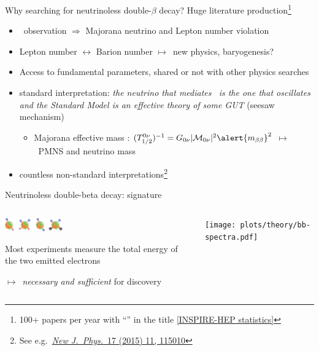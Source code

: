 \documentclass[10pt,aspectratio=169]{beamer}
\newcommand{\arrow}{$\longmapsto$}
\begin{document}
\begin{frame}{Why searching for neutrinoless double-$\beta$ decay?}
  Huge literature production\footnote{%
    100+ papers per year with ``\onbb'' in the title
    \href{https://inspirehep.net/literature?sort=mostrecent&size=25&page=1&q=find\%20t\%20\%CE\%B2\%CE\%B2\%20or\%20double-beta\%20or\%20double\%20beta\%20or\%20double\%20\%CE\%B2\%20or\%20double-\%CE\%B2\%20or\%200\%CE\%BD\%CE\%B2\%CE\%B2&ui-citation-summary=true}{[INSPIRE-HEP statistics]}
  }
  \begin{itemize}
    \item \onbb\ observation $\Rightarrow$ \alert{Majorana neutrino} and \alert{Lepton number violation}
    \item Lepton number $\longleftrightarrow$ Barion number \arrow\
      \alert{new physics}, \alert{baryogenesis?}
    \item Access to fundamental parameters, shared or not with other
      physics searches
    \item \alert{standard interpretation}: \emph{the neutrino that mediates
      \onbb\ is the one that oscillates and the Standard Model is an effective
      theory of some GUT} (seesaw mechanism)
    \begin{itemize}
      \item Majorana effective mass \mbb:
        $(T^{0\nu}_{1/2})^{-1}=G_{0\nu} |\mathcal{M}_{0\nu}|^2 \alert{m_{\beta\beta}}^2$
        \arrow\ PMNS and neutrino mass
    \end{itemize}
  \item countless non-standard interpretations\footnote{See e.g.~\href{https://doi.org/10.1088/1367-2630/17/11/115010}{\emph{New J.~Phys.}~17 (2015) 11, 115010}}
  \end{itemize}
\end{frame}
\begin{frame}{Neutrinoless double-beta decay: signature}
  \begin{columns}
    \begin{column}{0.5\textwidth}
      \begin{center}
        \includegraphics[width=2.5cm,angle=-90,clip,trim=200 0 500 0]{plots/theory/bb-artist-newphy.png}
      \end{center}

      Most experiments measure the \alert{total energy of the two emitted
      electrons}

      \vspace*{16pt}
      \arrow\ \emph{necessary and sufficient} for discovery
    \end{column}
    \begin{column}{0.5\textwidth}
      \begin{center}
        \texttt{[image: plots/theory/bb-spectra.pdf]}
      \end{center}
    \end{column}
  \end{columns}
\end{frame}
\end{document}

